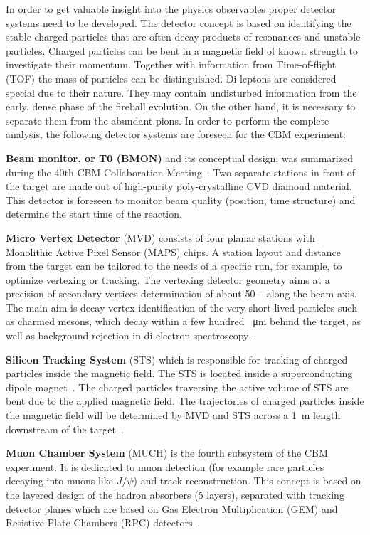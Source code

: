 In order to get valuable insight into the physics observables proper detector systems need to be developed. The detector concept is based on identifying the stable charged particles that are often decay products of resonances and unstable particles. Charged particles can be bent in a magnetic field of known strength to investigate their momentum. Together with information from Time-of-flight (\gls{TOF}) the mass of particles can be distinguished. Di-leptons are considered special due to their nature. They may contain undisturbed information from the early, dense phase of the fireball evolution. On the other hand, it is necessary to separate them from the abundant pions. In order to perform the complete analysis, the following detector systems are foreseen for the \gls{CBM} experiment:\bigbreak


\textbf{Beam monitor, or T0 (\gls{BMON})} and its conceptual design, was summarized during the 40th \gls{CBM} Collaboration Meeting~\cite{bmon}. Two separate stations in front of the target are made out of high-purity poly-crystalline CVD diamond material. This detector is foreseen to monitor beam quality (position, time structure) and determine the start time of the reaction.\bigbreak

\textbf{Micro Vertex Detector} (\gls{MVD}) consists of four planar stations with Monolithic Active Pixel Sensor (\gls{MAPS}) chips. A station layout and distance from the target can be tailored to the needs of a specific run, for example, to optimize vertexing or tracking. The vertexing detector geometry aims at a precision of secondary vertices determination of about 50 --  along the beam axis. The main aim is decay vertex identification of the very short-lived particles such as charmed mesons, which decay within a few hundred \SI{}{\micro\metre} behind the target, as well as background rejection in di-electron spectroscopy~\cite{MVD}.\bigbreak

 \textbf{Silicon Tracking System} (\gls{STS}) which is responsible for tracking of charged particles inside the magnetic field. The \gls{STS} is located inside a superconducting dipole magnet~\cite{Malakhov:109025}. The charged particles traversing the active volume of \gls{STS} are bent due to the applied magnetic field. The trajectories of charged particles inside the magnetic field will be determined by MVD and STS across a \SI{1}{\metre} length downstream of the target~\cite{Heuser:54798}.\bigbreak
 
\textbf{Muon Chamber System} (\gls{MUCH}) is the fourth subsystem of the \gls{CBM} experiment. It is dedicated to muon detection (for example rare particles decaying into muons like $J/\psi$) and track reconstruction. This concept is based on the layered design of the hadron absorbers (5 layers), separated with tracking detector planes which are based on Gas Electron Multiplication (\gls{GEM}) and Resistive Plate Chambers (\gls{RPC}) detectors~\cite{MUCH}.\bigbreak

